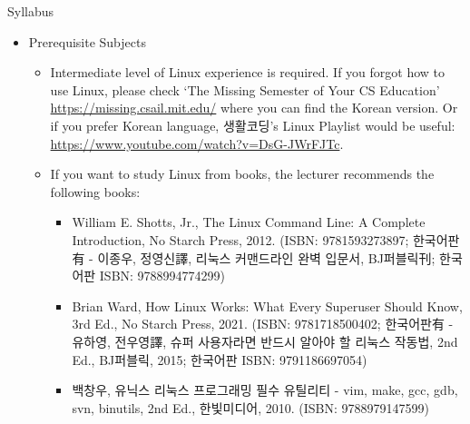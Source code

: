 \begin{frame}{Syllabus}
  \begin{itemize}
  \item Prerequisite Subjects
    \begin{itemize}
      \item Intermediate level of Linux experience is required. If you forgot how to use Linux, please check `The Missing Semester of Your CS Education' \url{https://missing.csail.mit.edu/} where you can find the Korean version. Or if you prefer Korean language, 생활코딩's Linux Playlist would be useful: \url{https://www.youtube.com/watch?v=DsG-JWrFJTc}.
      \item If you want to study Linux from books, the lecturer recommends the following books:
        \begin{itemize}
          \item William E. Shotts, Jr., The Linux Command Line: A Complete Introduction, No Starch Press, 2012. (ISBN: 9781593273897; 한국어판有 - 이종우, 정영신譯, 리눅스 커맨드라인 완벽 입문서, BJ퍼블릭刊; 한국어판 ISBN: 9788994774299)
          \item Brian Ward, How Linux Works: What Every Superuser Should Know, 3rd Ed., No Starch Press, 2021. (ISBN: 9781718500402; 한국어판有 - 유하영, 전우영譯, 슈퍼 사용자라면 반드시 알아야 할 리눅스 작동법, 2nd Ed., BJ퍼블릭, 2015; 한국어판 ISBN: 9791186697054)
          \item 백창우, 유닉스 리눅스 프로그래밍 필수 유틸리티 - vim, make, gcc, gdb, svn, binutils, 2nd Ed., 한빛미디어, 2010. (ISBN: 9788979147599)
        \end{itemize}
    \end{itemize}
  \end{itemize}
\end{frame}


